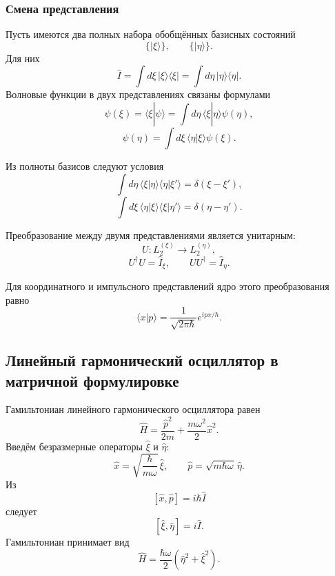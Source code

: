 \documentclass[12pt,a4paper]{article}
\begin{document}
\subsubsection{Смена представления}

Пусть имеются два полных набора обобщённых базисных состояний
\[
    \{|\xi\rangle\},
    \qquad
    \{|\eta\rangle\}.
\]
Для них
\[
    \hat I
    =
    \int d\xi\,|\xi\rangle\langle\xi|
    =
    \int d\eta\,|\eta\rangle\langle\eta|.
\]
Волновые функции в двух представлениях связаны формулами
\[
    \boxed{
    \psi(\xi)
    =
    \langle\xi|\psi\rangle
    =
    \int d\eta\,
        \langle\xi|\eta\rangle
        \psi(\eta)
    },
\]
\[
    \boxed{
    \psi(\eta)
    =
    \int d\xi\,
        \langle\eta|\xi\rangle
        \psi(\xi)
    }.
\]

Из полноты базисов следуют условия
\[
    \boxed{
    \int d\eta\,
        \langle\xi|\eta\rangle
        \langle\eta|\xi'\rangle
    =
    \delta(\xi-\xi')
    },
\]
\[
    \boxed{
    \int d\xi\,
        \langle\eta|\xi\rangle
        \langle\xi|\eta'\rangle
    =
    \delta(\eta-\eta')
    }.
\]

Преобразование между двумя представлениями является унитарным:
\[
    U:L_2^{(\xi)}\longrightarrow L_2^{(\eta)},
\]
\[
    \boxed{
        U^\dagger U=\hat I_\xi,
        \qquad
        UU^\dagger=\hat I_\eta
    }.
\]

Для координатного и импульсного представлений ядро этого преобразования
равно
\[
    \boxed{
        \langle x|p\rangle
        =
        \frac{1}{\sqrt{2\pi\hbar}}
        e^{ipx/\hbar}
    }.
\]


\subsection{Линейный гармонический осциллятор в матричной формулировке}

Гамильтониан линейного гармонического осциллятора равен
\[
    \boxed{
        \hat H
        =
        \frac{\hat p^2}{2m}
        +
        \frac{m\omega^2}{2}\hat x^2
    }.
\]
Введём безразмерные операторы $\hat\xi$ и $\hat\eta$:
\[
    \boxed{
        \hat x
        =
        \sqrt{\frac{\hbar}{m\omega}}\,
        \hat\xi,
        \qquad
        \hat p
        =
        \sqrt{m\hbar\omega}\,
        \hat\eta
    }.
\]
Из
\[
    [\hat x,\hat p]=i\hbar\hat I
\]
следует
\[
    \boxed{
        [\hat\xi,\hat\eta]
        =
        i\hat I
    }.
\]
Гамильтониан принимает вид
\[
    \boxed{
        \hat H
        =
        \frac{\hbar\omega}{2}
        \left(
            \hat\eta^2+\hat\xi^2
        \right)
    }.
\]
\end{document}
